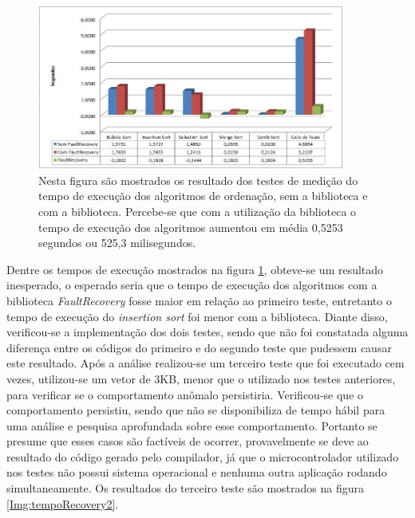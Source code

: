 \begin{figure}[h]
	\centering
	\includegraphics[width=0.9\textwidth]{figuras/tempoRecovery.jpg}
	\caption[Tempo de execução da biblioteca \textit{FaultRecovery}]{Nesta figura são mostrados os resultado dos testes de medição do tempo de execução dos algoritmos de ordenação, sem a biblioteca e com a biblioteca. Percebe-se que com a utilização da biblioteca o tempo de execução dos algoritmos aumentou em média 0,5253 segundos ou 525,3 milisegundos.}
	\label{Img:tempoRecovery}	
\end{figure}	
\newpage
Dentre os tempos de execução mostrados na figura \ref{Img:tempoRecovery}, obteve-se um resultado inesperado, o esperado seria que o tempo de execução dos algoritmos com a biblioteca \textit{FaultRecovery} fosse maior em relação ao primeiro teste, entretanto o tempo de execução do \textit{insertion sort} foi menor com a biblioteca. Diante disso, verificou-se a implementação dos dois testes, sendo que não foi constatada alguma diferença entre os códigos do primeiro e do segundo teste que pudessem causar este resultado. Após a análise realizou-se um terceiro teste que foi executado cem vezes, utilizou-se um vetor de 3KB, menor que o utilizado nos testes anteriores, para verificar se o comportamento anômalo persistiria. Verificou-se que o comportamento persistiu, sendo que não se disponibiliza de tempo hábil para uma análise e pesquisa aprofundada sobre esse comportamento. Portanto se presume que esses casos são factíveis de ocorrer, provavelmente se deve ao resultado do código gerado pelo compilador, já que o microcontrolador utilizado nos testes não possui sistema operacional e nenhuma outra aplicação rodando simultaneamente. Os resultados do terceiro teste são mostrados na figura \ref{Img:tempoRecovery2}.

